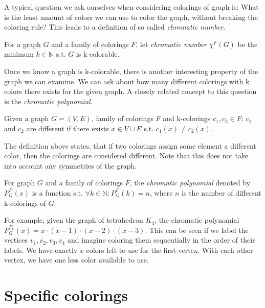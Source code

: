     A typical question we ask ourselves when considering colorings of graph is: What is the least amount of colors we can use to color the graph, without breaking the coloring rule? This leads to a definition of so called \textit{chromatic number}. 

\begin{definition}
    For a graph $G$ and a family of colorings $F$, let \textit{chromatic number} $\chi ^F (G)$ be the minimum $k \in \mathbb{N}$ s.t. $G$ is k-colorable.
\end{definition}

    Once we know a graph is k-colorable, there is another interesting property of the graph we can examine. We can ask about how many different colorings with k colors there exists for the given graph. A closely related concept to this question is the \textit{chromatic polynomial}.

    \begin{definition}
        Given a graph $G=(V,E)$, family of colorings $F$ and k-colorings $c_1,c_2 \in F$: $c_1$ and $c_2$ are different if there exists $x \in V \cup E$ s.t. $c_1(x) \neq c_2(x)$.
    \end{definition}

    The definition above states, that if two colorings assign some element a different color, then the colorings are considered different. Note that this does not take into account any symmetries of the graph.

    \begin{definition}
        For graph $G$ and a family of colorings $F$, the \textit{chromatic polynomial} denoted by $P^{F}_G(x)$ is a function s.t. $\forall k \in \mathbb{N} : P^{F}_G(k) = n$, where $n$ is the number of different k-colorings of $G$.
    \end{definition}

    For example, given the graph of tetrahedron $K_4$, the chromatic polynomial $P^{F_V}_G(x) = x \cdot (x-1) \cdot (x-2) \cdot (x-3)$. This can be seen if we label the vertices $v_1,v_2,v_3,v_4$ and imagine coloring them sequentially in the order of their labels. We have exactly $x$ colors left to use for the first vertex. With each other vertex, we have one less color available to use. 
    

\section{Specific colorings}

